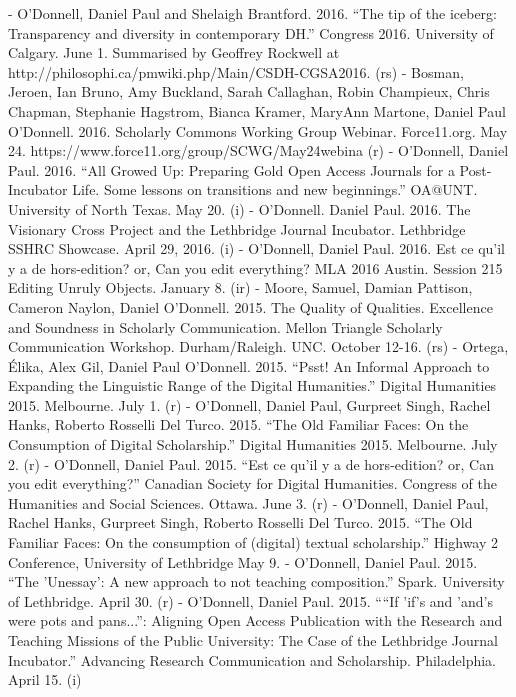 - O’Donnell, Daniel Paul and Shelaigh Brantford. 2016. “The tip of the iceberg: Transparency and diversity in contemporary DH.” Congress 2016. University of Calgary. June 1. Summarised by Geoffrey Rockwell at http:/\allowbreak{}/\allowbreak{}philosophi.ca/\allowbreak{}pmwiki.php/\allowbreak{}Main/\allowbreak{}CSDH-CGSA2016. (rs)
- Bosman, Jeroen, Ian Bruno, Amy Buckland, Sarah Callaghan, Robin Champieux, Chris Chapman, Stephanie Hagstrom, Bianca Kramer, MaryAnn Martone, Daniel Paul O'Donnell. 2016. Scholarly Commons Working Group Webinar. Force11.org. May 24. https:/\allowbreak{}/\allowbreak{}www.force11.org/\allowbreak{}group/\allowbreak{}SCWG/\allowbreak{}May24webina (r)
- O’Donnell, Daniel Paul. 2016. “All Growed Up: Preparing Gold Open Access Journals for a Post-Incubator Life. Some lessons on transitions and new beginnings.” OA@UNT. University of North Texas. May 20. (i)
- O’Donnell. Daniel Paul. 2016. The Visionary Cross Project and the Lethbridge Journal Incubator. Lethbridge SSHRC Showcase. April 29, 2016. (i)
- O’Donnell, Daniel Paul. 2016. Est ce qu’il y a de hors-edition? or, Can you edit everything? MLA 2016 Austin. Session 215 Editing Unruly Objects. January 8. (ir)
- Moore\*, Samuel, Damian Pattison, Cameron Naylon, Daniel O'Donnell. 2015. The Quality of Qualities. Excellence and Soundness in Scholarly Communication. Mellon Triangle Scholarly Communication Workshop. Durham/\allowbreak{}Raleigh. UNC. October 12-16. (rs)
- Ortega, Élika, Alex Gil, Daniel Paul O'Donnell. 2015. “Psst! An Informal Approach to Expanding the Linguistic Range of the Digital Humanities.” Digital Humanities 2015. Melbourne. July 1. (r)
- O'Donnell, Daniel Paul, Gurpreet Singh\*, Rachel Hanks\*, Roberto Rosselli Del Turco. 2015. “The Old Familiar Faces: On the Consumption of Digital Scholarship.” Digital Humanities 2015. Melbourne. July 2. (r)
- O'Donnell, Daniel Paul. 2015. “Est ce qu’il y a de hors-edition? or, Can you edit everything?” Canadian Society for Digital Humanities. Congress of the Humanities and Social Sciences. Ottawa. June 3. (r)
- O'Donnell, Daniel Paul, Rachel Hanks\*, Gurpreet Singh\*, Roberto Rosselli Del Turco. 2015. “The Old Familiar Faces: On the consumption of (digital) textual scholarship.” Highway 2 Conference, University of Lethbridge May 9.
- O’Donnell, Daniel Paul. 2015. “The 'Unessay': A new approach to not teaching composition.” Spark. University of Lethbridge. April 30. (r)
- O’Donnell, Daniel Paul. 2015. ““If 'if's and 'and's were pots and pans...”: Aligning Open Access Publication with the Research and Teaching Missions of the Public University: The Case of the Lethbridge Journal Incubator.” Advancing Research Communication and Scholarship. Philadelphia. April 15. (i)
